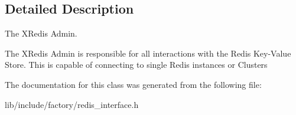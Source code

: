 \subsection{Detailed Description}
The X\-Redis Admin. 

The X\-Redis Admin is responsible for all interactions with the Redis Key-\/\-Value Store. This is capable of connecting to single Redis instances or Clusters 

The documentation for this class was generated from the following file\-:\begin{DoxyCompactItemize}
\item 
lib/include/factory/redis\-\_\-interface.\-h\end{DoxyCompactItemize}
